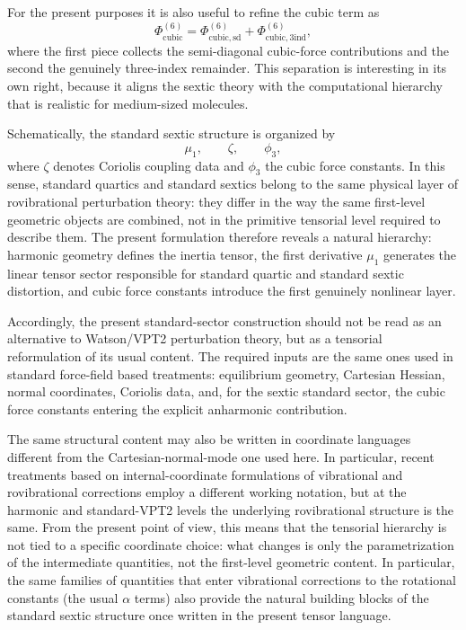 \documentclass[journal=jacsat,manuscript=article]{achemso}
\begin{document}
For the present purposes it is also useful to refine the cubic term as
\begin{equation}
\Phi^{(6)}_{\mathrm{cubic}}
=
\Phi^{(6)}_{\mathrm{cubic,sd}}
+
\Phi^{(6)}_{\mathrm{cubic,3ind}},
\end{equation}
where the first piece collects the semi-diagonal cubic-force
contributions and the second the genuinely three-index remainder. This
separation is interesting in its own right, because it aligns the
sextic theory with the computational hierarchy that is realistic for
medium-sized molecules.

Schematically, the standard sextic structure is organized by
\begin{equation}
\mu_1,\qquad \zeta,\qquad \phi_3,
\end{equation}
where $\zeta$ denotes Coriolis coupling data and $\phi_3$ the cubic
force constants. In this sense, standard quartics and standard sextics
belong to the same physical layer of rovibrational perturbation
theory: they differ in the way the same first-level geometric objects
are combined, not in the primitive tensorial level required to
describe them.
The present formulation therefore reveals a natural hierarchy: harmonic
geometry defines the inertia tensor, the first derivative $\mu_1$
generates the linear tensor sector responsible for standard quartic and
standard sextic distortion, and cubic force constants introduce the
first genuinely nonlinear layer.

Accordingly, the present standard-sector construction should not be
read as an alternative to Watson/VPT2 perturbation theory, but as a
tensorial reformulation of its usual content. The required inputs are
the same ones used in standard force-field based treatments:
equilibrium geometry, Cartesian Hessian, normal coordinates, Coriolis
data, and, for the sextic standard sector, the cubic force constants
entering the explicit anharmonic contribution.

The same structural content may also be written in coordinate
languages different from the Cartesian-normal-mode one used here. In
particular, recent treatments based on internal-coordinate
formulations of vibrational and rovibrational corrections employ a
different working notation, but at the harmonic and standard-VPT2
levels the underlying rovibrational structure is the same.\cite{cubic-internal_2024}
From the present point of view, this means that the tensorial
hierarchy is not tied to a specific coordinate choice: what changes is
only the parametrization of the intermediate quantities, not the
first-level geometric content. In particular, the same families of
quantities that enter vibrational corrections to the rotational
constants (the usual $\alpha$ terms) also provide the natural building
blocks of the standard sextic structure once written in the present
tensor language.
\end{document}
